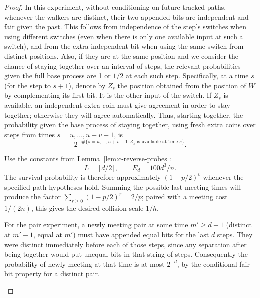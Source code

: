 \begin{proof}
In this experiment, without conditioning on future tracked paths, whenever the walkers are
distinct, their two appended bits are independent and fair given the past. This follows from
independence of the step's switches when using different switches (even when there is only one
available input at such a switch), and from the extra independent bit when using the same switch from
distinct positions. Also, if they are at the same position and we consider the chance of
staying together over an interval of steps, the relevant probabilities given the full base
process are 1 or \(1/2\) at each such step. Specifically, at a time \(s\) (for the step to
\(s+1\)), denote by \(Z_s\) the position obtained from the position of \(W\) by complementing
its first bit. It is the other input of the switch. If \(Z_s\) is available, an independent extra
coin must give agreement in order to stay together; otherwise they will agree automatically.
Thus, starting together, the probability given the base process of staying together, using
fresh extra coins over steps from times \(s=u,\dots,u+v-1\), is
\begin{equation}
2^{-\#\{s=u,\ldots,u+v-1: Z_s\text{ is available at time }s\}}.                 \label{c:probes:eq:2}
\end{equation}

Use the constants from Lemma~\ref{lem:c-reverse-probes}:
\[
L=\lfloor d/2\rfloor,\qquad E_d=100 d^3/n.
\]
The survival probability is therefore approximately $(1-p/2)^v$
whenever the specified-path hypotheses hold. Summing the possible last
meeting times will produce the factor
$\sum_{r\ge0}(1-p/2)^r=2/p$; paired with a meeting cost $1/(2n)$,
this gives the desired collision scale $1/h$.

\label{c:probes:p013}

For the pair experiment, a newly meeting pair at some time \(m'\ge d+1\) (distinct at \(m'-1\),
equal at \(m'\)) must have appended equal bits for the last \(d\) steps. They were distinct
immediately before each of those steps, since any separation after being together would put
unequal bits in that string of steps. Consequently the probability of newly meeting at that
time is at most \(2^{-d}\), by the conditional fair bit property for a distinct pair.

\label{c:probes:p014}


\end{proof}
